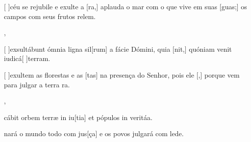 {    {\item {}[ ]{céu} se rejubile e exulte a [ra,] aplauda o mar com o que vive em suas [guas;] os campos com seus frutos relem.~\Antiphona},
  {\item {}[ ]{ex}sultábunt ómnia ligna sil[rum] a fácie Dómini, quia [nit,] quóniam venit iudicá[ ]{ter}ram.~\Antiphona}%
    {\item {}[ ]{e}xultem as florestas e as [tas] na presença do Senhor, pois ele [,] porque vem para julgar a terra ra.~\Antiphona},
  {\item {}cábit orbem terræ in iu[tia] et pópulos in veritáa.~\Antiphona}%
    {\item {}nará o mundo todo com jus[ça] e os povos julgará com lede.~\Antiphona}
}